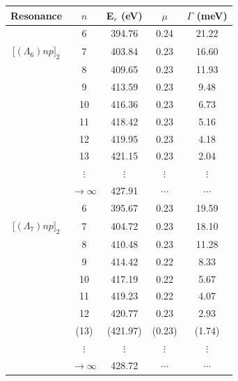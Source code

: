 \begin{table}[h]
\footnotesize
\begin{center}
\begin{tabular}{@{} l c c c c @{}}
\toprule

\multicolumn{1}{c}{Resonance} & \multicolumn{1}{c}{$n$} & \multicolumn{1}{c}{E$_r$ (eV)} & \multicolumn{1}{c}{$\mu$} & \multicolumn{1}{c}{$\Gamma$ (meV)}  \\

\toprule
        
  \multicolumn{1}{c}{} & 6 & 394.76 & 0.24 & 21.22  \\        
  \multicolumn{1}{c}{[$(\Lambda_6)np]_{2}$} & 7 & 403.84 & 0.23 & 16.60\\
  \multicolumn{1}{c}{} & 8 & 409.65 & 0.23 & 11.93  \\
  \multicolumn{1}{c}{} & 9 & 413.59 & 0.23 & 9.48  \\
  \multicolumn{1}{c}{} & 10 & 416.36 & 0.23 & 6.73  \\
  \multicolumn{1}{c}{} & 11 & 418.42 & 0.23 & 5.16  \\
  \multicolumn{1}{c}{} & 12 & 419.95 & 0.23 & 4.18  \\
  \multicolumn{1}{c}{} & 13 & 421.15 & 0.23 & 2.04  \\
  \multicolumn{1}{c}{} & $\vdots$ & $\vdots$ & $\vdots$ & $\vdots$ \\
  \multicolumn{1}{c}{} & $\rightarrow \infty$ & 427.91 & $\cdots$ & $\cdots$ \\
           \midrule
          \multicolumn{1}{c}{}  & 6 & 395.67 & 0.23 & 19.59 \\        
  \multicolumn{1}{c}{[$(\Lambda_7)np]_{2}$} & 7 & 404.72 & 0.23 & 18.10 \\
  \multicolumn{1}{c}{}  & 8 & 410.48 & 0.23 & 11.28 \\
  \multicolumn{1}{c}{} & 9 & 414.42 & 0.22 & 8.33 \\
  \multicolumn{1}{c}{}  & 10 & 417.19 & 0.22 & 5.67 \\
  \multicolumn{1}{c}{}  & 11 & 419.23 & 0.22 & 4.07 \\
  \multicolumn{1}{c}{} & 12 & 420.77 & 0.23 & 2.93 \\
  \multicolumn{1}{c}{} & (13) & (421.97) & (0.23) & (1.74) \\
  \multicolumn{1}{c}{} & $\vdots$ & $\vdots$ & $\vdots$ & $\vdots$ \\
  \multicolumn{1}{c}{} & $\rightarrow \infty$ & 428.72 & $\cdots$ & $\cdots$ \\

\end{tabular}
\end{center}
\end{table}
